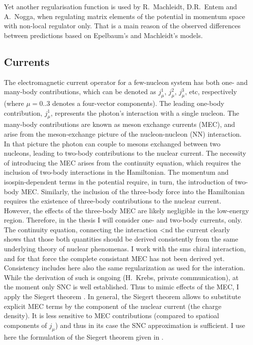 
Yet another regularisation function  is used by R.~Machleidt, D.R.~Entem and A.~Nogga, 
when regulating matrix elements of the potential in momentum space with non-local regulator only.
That is a main reason of the observed differences between predictions based on Epelbaum's
and Machleidt's models. 

\subsection*{Currents}


The electromagnetic current operator for a few-nucleon system has both one- and many-body contributions, which
can be denoted as $j_\mu^1$, $j_\mu^2$, $j_\mu^3$, etc, respectively 
(where $\mu = 0..3$ denotes a four-vector components).
The leading one-body contribution,
$j_\mu^1$, represents the photon's interaction with a single nucleon. The many-body contributions are known as
meson exchange currents (MEC), and arise from the meson-exchange picture of the nucleon-nucleon (NN)
interaction. 
In that picture the photon can couple to mesons exchanged between two nucleons, leading to two-body contributions to
the nuclear current.
The necessity of introducing the MEC arises from the continuity equation, which requires the inclusion of
two-body interactions in the Hamiltonian. The momentum and isospin-dependent terms 
in the potential require, in turn, the
introduction of two-body MEC. Similarly, the inclusion of the three-body force into the Hamiltonian requires the
existence of three-body contributions to the nuclear current. However, the effects of the three-body MEC are
likely negligible in the low-energy region.
Therefore, in the thesis I will consider one- and two-body currents, only.
The continuity equation, connecting the interaction <nd the current clearly shows 
that those both quantities should be derived consistently from the same underlying theory
of nuclear phenomenas.
I work with the \gls{sms} chiral interaction, and for that force the complete consistant MEC
has not been derived yet.
Consistency includes here also the same regularization  as used for the interation.
While the derivation of such is ongoing (H.~Krebs, private communication), at the moment
only SNC is well established.
Thus to mimic  effects of the MEC, I apply the Siegert theorem \cite{Siegert, GolakKamad2000_ExplDescr}.
In general, the Siegert theorem allows to substitute
explicit MEC terms by the  component of the nuclear current (the charge density).
It is less sensitive to MEC contributions (compared to spatioal components of $j_\mu$)
and thus in its case the SNC approximation is sufficient.
I use here the formulation of the Siegert theorem given in \cite{GolakKamad2000_ExplDescr}.

